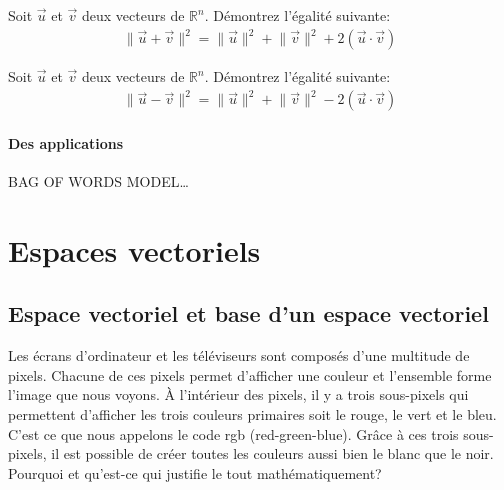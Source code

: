 \documentclass[]{book}
\theoremstyle{definition}
\theoremstyle{definition}
\theoremstyle{definition}
\theoremstyle{remark}
\let\BeginKnitrBlock\begin \let\EndKnitrBlock\end
\begin{document}
\BeginKnitrBlock{example}
\protect\hypertarget{exm:unnamed-chunk-184}{}{\label{exm:unnamed-chunk-184} }Soit \(\overrightarrow{u}\) et \(\overrightarrow{v}\) deux vecteurs de \(\mathbb{R}^n\). Démontrez l'égalité suivante:
\begin{align*}
\lVert\overrightarrow{u}+\overrightarrow{v}\rVert^2=\lVert\overrightarrow{u}\rVert^2+\lVert\overrightarrow{v}\rVert^2+2(\overrightarrow{u}\cdot \overrightarrow{v})
\end{align*}
\EndKnitrBlock{example}

\BeginKnitrBlock{example}
\protect\hypertarget{exm:unnamed-chunk-185}{}{\label{exm:unnamed-chunk-185} }Soit \(\overrightarrow{u}\) et \(\overrightarrow{v}\) deux vecteurs de \(\mathbb{R}^n\). Démontrez l'égalité suivante:
\begin{align*}
\lVert\overrightarrow{u}-\overrightarrow{v}\rVert^2=\lVert\overrightarrow{u}\rVert^2+\lVert\overrightarrow{v}\rVert^2-2(\overrightarrow{u}\cdot \overrightarrow{v})
\end{align*}
\EndKnitrBlock{example}

\hypertarget{des-applications-1}{%
\subsection{Des applications}\label{des-applications-1}}

\BeginKnitrBlock{example}
\protect\hypertarget{exm:unnamed-chunk-186}{}{\label{exm:unnamed-chunk-186} }BAG OF WORDS MODEL\ldots{}
\EndKnitrBlock{example}

\hypertarget{part-espaces-vectoriels}{%
\part{Espaces vectoriels}\label{part-espaces-vectoriels}}

\hypertarget{espace-vectoriel}{%
\chapter{Espace vectoriel et base d'un espace vectoriel}\label{espace-vectoriel}}

Les écrans d'ordinateur et les téléviseurs sont composés d'une multitude de pixels. Chacune de ces pixels permet d'afficher une couleur et l'ensemble forme l'image que nous voyons. À l'intérieur des pixels, il y a trois sous-pixels qui permettent d'afficher les trois couleurs primaires soit le rouge, le vert et le bleu. C'est ce que nous appelons le code rgb (red-green-blue). Grâce à ces trois sous-pixels, il est possible de créer toutes les couleurs aussi bien le blanc que le noir. Pourquoi et qu'est-ce qui justifie le tout mathématiquement?
\end{document}
